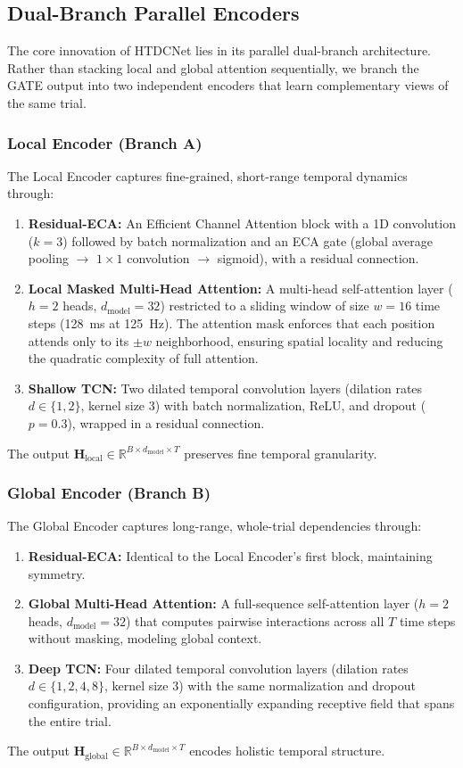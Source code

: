 \documentclass[conference]{IEEEtran}
\begin{document}
\subsection{Dual-Branch Parallel Encoders}
The core innovation of HTDCNet lies in its parallel dual-branch architecture.
Rather than stacking local and global attention sequentially, we branch the GATE output into two independent encoders that learn complementary views of the same trial.

\subsubsection{Local Encoder (Branch A)}
The Local Encoder captures fine-grained, short-range temporal dynamics through:
\begin{enumerate}
    \item \textbf{Residual-ECA:} An Efficient Channel Attention block with a 1D convolution ($k=3$) followed by batch normalization and an ECA gate (global average pooling $\to$ $1 \times 1$ convolution $\to$ sigmoid), with a residual connection.
    \item \textbf{Local Masked Multi-Head Attention:} A multi-head self-attention layer ($h=2$ heads, $d_{\text{model}}=32$) restricted to a sliding window of size $w=16$ time steps (128~ms at 125~Hz). The attention mask enforces that each position attends only to its $\pm w$ neighborhood, ensuring spatial locality and reducing the quadratic complexity of full attention.
    \item \textbf{Shallow TCN:} Two dilated temporal convolution layers (dilation rates $d \in \{1, 2\}$, kernel size 3) with batch normalization, ReLU, and dropout ($p=0.3$), wrapped in a residual connection.
\end{enumerate}
The output $\mathbf{H}_{\text{local}} \in \mathbb{R}^{B \times d_{\text{model}} \times T}$ preserves fine temporal granularity.

\subsubsection{Global Encoder (Branch B)}
The Global Encoder captures long-range, whole-trial dependencies through:
\begin{enumerate}
    \item \textbf{Residual-ECA:} Identical to the Local Encoder's first block, maintaining symmetry.
    \item \textbf{Global Multi-Head Attention:} A full-sequence self-attention layer ($h=2$ heads, $d_{\text{model}}=32$) that computes pairwise interactions across all $T$ time steps without masking, modeling global context.
    \item \textbf{Deep TCN:} Four dilated temporal convolution layers (dilation rates $d \in \{1, 2, 4, 8\}$, kernel size 3) with the same normalization and dropout configuration, providing an exponentially expanding receptive field that spans the entire trial.
\end{enumerate}
The output $\mathbf{H}_{\text{global}} \in \mathbb{R}^{B \times d_{\text{model}} \times T}$ encodes holistic temporal structure.
\end{document}
